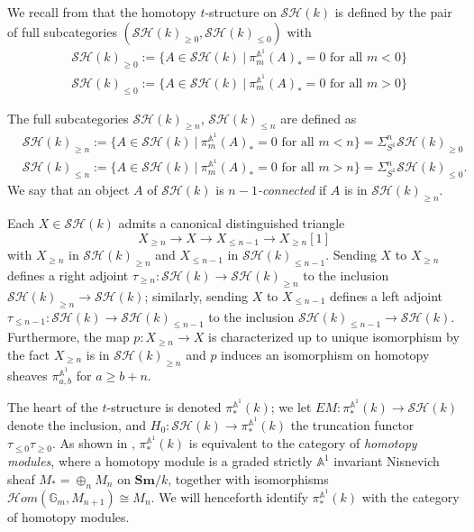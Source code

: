 \documentclass[a4paper,12pt,draft]{amsart}
\theoremstyle{definition}
\theoremstyle{remark}
\begin{document}
We recall from \cite[\S 5.2]{Mor04a} that the homotopy $t$-structure on ${\mathcal{SH}}(k)$ is defined by the pair of full subcategories $({\mathcal{SH}}(k)_{\ge 0}, {\mathcal{SH}}(k)_{\le0})$ with
\begin{align*}
&{\mathcal{SH}}(k)_{\ge 0}:=\{A\in {\mathcal{SH}}(k)\ |\ \pi^{{{\mathbb A}}^1}_m(A)_*=0\text{ for all } m<0\}\\
&{\mathcal{SH}}(k)_{\le 0}:=\{A\in {\mathcal{SH}}(k)\ |\ \pi^{{{\mathbb A}}^1}_m(A)_*=0\text{ for all } m>0\}
\end{align*}
 
The full subcategories ${\mathcal{SH}}(k)_{\ge n}$, ${\mathcal{SH}}(k)_{\le n}$ are defined as
\begin{align*}
&{\mathcal{SH}}(k)_{\ge n}:=\{A\in {\mathcal{SH}}(k)\ |\ \pi^{{{\mathbb A}}^1}_m(A)_*=0\text{ for all } m<n\}=\Sigma_{S^1}^n{\mathcal{SH}}(k)_{\ge 0}\\
&{\mathcal{SH}}(k)_{\le n}:=\{A\in {\mathcal{SH}}(k)\ |\ \pi^{{{\mathbb A}}^1}_m(A)_*=0\text{ for all } m>n\}=\Sigma_{S^1}^n{\mathcal{SH}}(k)_{\le 0}.
\end{align*}
We say that an object $A$ of ${\mathcal{SH}}(k)$ is {\em $n-1$-connected} if $A$ is in ${\mathcal{SH}}(k)_{\ge n}$.

Each $X\in {\mathcal{SH}}(k)$ admits a canonical distinguished triangle
\[
X_{\ge n}\to X\to X_{\le n-1}\to X_{\ge n}[1]
\]
with $X_{\ge n}$ in ${\mathcal{SH}}(k)_{\ge n}$ and $X_{\le n-1}$ in ${\mathcal{SH}}(k)_{\le n-1}$. Sending $X$ to $X_{\ge n}$ defines a right   adjoint $\tau_{\ge n}:{\mathcal{SH}}(k)\to {\mathcal{SH}}(k)_{\ge n}$ to the inclusion ${\mathcal{SH}}(k)_{\ge n}\to {\mathcal{SH}}(k)$; similarly,  sending $X$ to $X_{\le n-1}$ defines a left adjoint $\tau_{\le n-1}:{\mathcal{SH}}(k)\to {\mathcal{SH}}(k)_{\le n-1}$ to the inclusion ${\mathcal{SH}}(k)_{\le n-1}\to {\mathcal{SH}}(k)$. Furthermore, the map $p:X_{\ge n}\to X$ is characterized up to unique isomorphism by the fact $X_{\ge n}$ is in ${\mathcal{SH}}(k)_{\ge n}$ and $p$ induces an isomorphism on homotopy sheaves $\pi^{{{\mathbb A}}^1}_{a,b}$ for $a\ge b+n$. 

The heart of the $t$-structure is denoted $\pi_*^{{{\mathbb A}}^1}(k)$; we let $EM:\pi_*^{{{\mathbb A}}^1}(k)\to {\mathcal{SH}}(k)$ denote the inclusion, and $H_0:{\mathcal{SH}}(k)\to \pi_*^{{{\mathbb A}}^1}(k)$ the truncation functor $\tau_{\le 0}\tau_{\ge0}$.  As shown in \cite[Theorem 5.2.6]{Mor04a}, 
$\pi_*^{{{\mathbb A}}^1}(k)$ is equivalent to the category of {\em homotopy modules}, where a homotopy module is a graded strictly ${{\mathbb A}}^1$ invariant Nisnevich sheaf $M_*=\oplus_nM_n$ on ${{\mathbf{Sm}}}/k$, together with isomorphisms ${{\mathcal{H}{om}}}({{\mathbb G}}_m, M_{n+1})\cong M_n$. We will henceforth identify $\pi_*^{{{\mathbb A}}^1}(k)$ with the category of homotopy modules.
\end{document}
